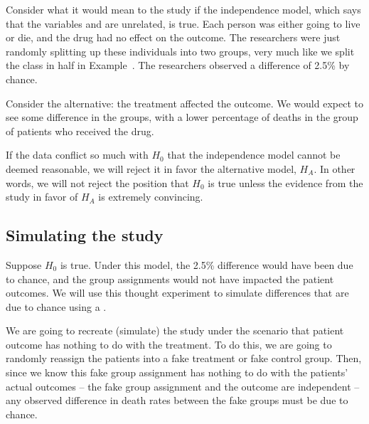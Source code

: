 
Consider what it would mean to the study if the independence model, which says that the variables  and  are unrelated, is true. Each person was either going to live or die, and the drug had no effect on the outcome. The researchers were just randomly splitting up these individuals into two groups, very much like we split the class in half in Example~. The researchers observed a difference of 2.5\% by chance.

Consider the alternative: the treatment affected the outcome. We would expect to see some difference in the groups, with a lower percentage of deaths in the group of patients who received the drug.

If the data conflict so much with $H_0$ that the independence model cannot be deemed reasonable, we will reject it in favor the alternative model, $H_A$. In other words, we will not reject the position that $H_0$ is true unless the evidence from the study in favor of $H_A$ is extremely convincing.

\subsection{Simulating the study}

Suppose $H_0$ is true. Under this model, the 2.5\% difference would have been due to chance, and the group assignments would not have impacted the patient outcomes. We will use this thought experiment to simulate differences that are due to chance using a .

We are going to recreate (simulate) the study under the scenario that patient outcome has nothing to do with the treatment. To do this, we are going to randomly reassign the patients into a fake treatment or fake control group. Then, since we know this fake group assignment has nothing to do with the patients' actual outcomes -- the fake group assignment and the outcome are independent -- any observed difference in death rates between the fake groups must be due to chance.

